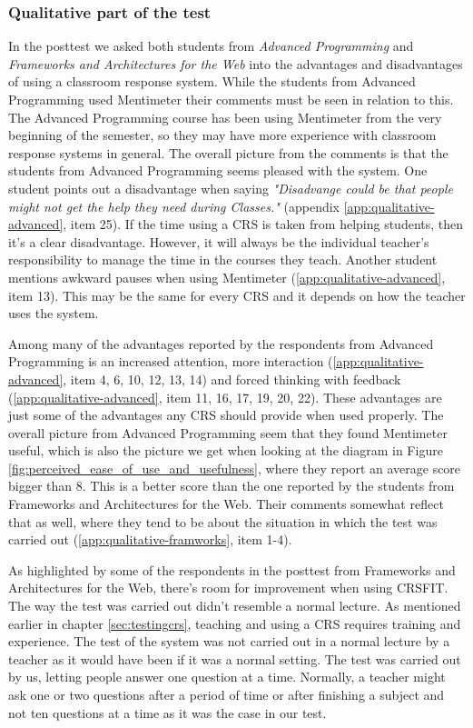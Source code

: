 \subsubsection*{Qualitative part of the test}
In the posttest we asked both students from \emph{Advanced Programming} and \emph{Frameworks and Architectures for the Web} into the advantages and disadvantages of using a classroom response system. While the students from Advanced Programming used Mentimeter their comments must be seen in relation to this. The Advanced Programming course has been using Mentimeter from the very beginning of the semester, so they may have more experience with classroom response systems in general. The overall picture from the comments is that the students from Advanced Programming seems pleased with the system. One student points out a disadvantage when saying \emph{"Disadvange could be that people might not get the help they need during Classes."} (appendix \ref{app:qualitative-advanced}, item 25). If the time using a CRS is taken from helping students, then it's a clear disadvantage. However, it will always be the individual teacher's responsibility to manage the time in the courses they teach. Another student mentions awkward pauses when using Mentimeter (\ref{app:qualitative-advanced}, item 13). This may be the same for every CRS and it depends on how the teacher uses the system.

Among many of the advantages reported by the respondents from Advanced Programming is an increased attention, more interaction (\ref{app:qualitative-advanced}, item 4, 6, 10, 12, 13, 14) and forced thinking with feedback (\ref{app:qualitative-advanced}, item 11, 16, 17, 19, 20, 22). These advantages are just some of the advantages any CRS should provide when used properly. The overall picture from Advanced Programming seem that they found Mentimeter useful, which is also the picture we get when looking at the diagram in Figure \ref{fig:perceived_ease_of_use_and_usefulness}, where they report an average score bigger than 8. This is a better score than the one reported by the students from Frameworks and Architectures for the Web. Their comments somewhat reflect that as well, where they tend to be about the situation in which the test was carried out (\ref{app:qualitative-framworks}, item 1-4).

As highlighted by some of the respondents in the posttest from Frameworks and Architectures for the Web, there's room for improvement when using CRSFIT. The way the test was carried out didn't resemble a normal lecture. As mentioned earlier in chapter \ref{sec:testingcrs}, teaching and using a CRS requires training and experience. The test of the system was not carried out in a normal lecture by a teacher as it would have been if it was a normal setting. The test was carried out by us, letting people answer one question at a time. Normally, a teacher might ask one or two questions after a period of time or after finishing a subject and not ten questions at a time as it was the case in our test.

